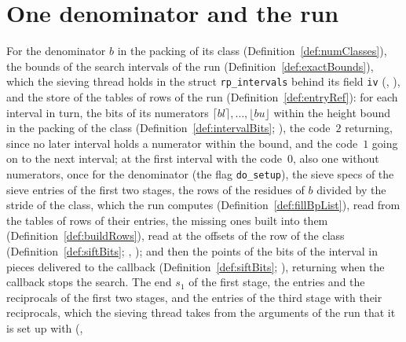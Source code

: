 \section{One denominator and the run}\label{sec:siftDen}

\begin{definition}\label{def:sift}
  \leanok
  For the denominator $b$ in the packing of its class (Definition~\ref{def:numClasses}), the bounds
  of the search intervals of the run (Definition~\ref{def:exactBounds}), which the sieving thread
  holds in the struct \verb|rp_intervals| behind its field \verb|iv|
  (, ), and the store of the
  tables of rows of the run (Definition~\ref{def:entryRef}): for each interval in turn, the bits of
  its numerators $\lceil b l \rceil, \dots, \lfloor b u \rfloor$ within the height bound in the
  packing of the class (Definition~\ref{def:intervalBits}; ), the
  code~$2$ returning, since no later interval holds a numerator within the bound, and the code~$1$
  going on to the next interval; at the first interval with the code~$0$, also one without
  numerators, once for the denominator (the flag \verb|do_setup|), the sieve specs of the sieve
  entries of the first two stages, the rows of the residues of $b$ divided by the stride of the
  class, which the run computes (Definition~\ref{def:fillBpList}), read from the tables of rows of
  their entries, the missing ones built into them (Definition~\ref{def:buildRows}), read at the
  offsets of the row of the class (Definition~\ref{def:siftBits};
  , ); and then the points of
  the bits of the interval in pieces delivered to the callback (Definition~\ref{def:siftBits};
  ), returning when the callback stops the search. The end $s_1$
  of the first stage, the entries and the reciprocals of the first two stages, and the entries of
  the third stage with their reciprocals, which the sieving thread takes from the arguments of the
  run that it is set up with (,

\end{definition}

